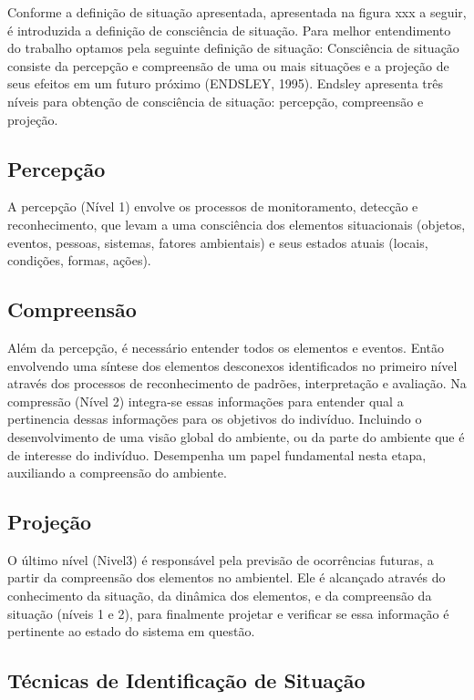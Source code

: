 \documentclass[12pt,a4paper,compsoc]{IEEEtran}
\begin{document}
  Conforme a definição de situação apresentada, apresentada na figura xxx a seguir, é introduzida a
  definição de consciência de situação. Para melhor entendimento do trabalho optamos pela seguinte
  definição de situação: Consciência de situação consiste da percepção e compreensão de uma ou mais
  situações e a projeção de seus efeitos em um futuro próximo (ENDSLEY, 1995). Endsley apresenta
  três níveis para obtenção de consciência de situação: percepção, compreensão e projeção.
  

\subsection{Percepção}

  A percepção (Nível 1)  envolve os processos de monitoramento, detecção e reconhecimento, que
  levam a uma consciência dos elementos situacionais (objetos, eventos, pessoas, sistemas, fatores
  ambientais) e seus estados atuais (locais, condições, formas, ações).


\subsection{Compreensão}

  Além da percepção, é necessário entender todos os elementos e eventos. Então envolvendo uma 
  síntese dos elementos desconexos identificados no primeiro nível através dos processos de 
  reconhecimento de padrões, interpretação e avaliação. Na compressão (Nível 2) integra-se essas
  informações para entender qual a pertinencia dessas informações para os objetivos do indivíduo.
  Incluindo o desenvolvimento de uma visão global do ambiente, ou da parte do ambiente que é de 
  interesse do indivíduo. Desempenha um papel fundamental nesta etapa, auxiliando a compreensão do
  ambiente.


\subsection{Projeção}

  O último nível (Nivel3)  é responsável pela previsão de ocorrências futuras, a partir da 
  compreensão dos elementos no ambientel. Ele é alcançado através do conhecimento da situação, da
  dinâmica dos elementos, e da compreensão da situação (níveis 1 e 2), para finalmente projetar e
  verificar se essa informação é pertinente ao estado do sistema em questão.


\subsection{Técnicas de Identificação de Situação}
\end{document}
